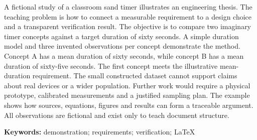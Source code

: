 A fictional study of a classroom sand timer illustrates an engineering thesis.
The teaching problem is how to connect a measurable requirement to a design
choice and a transparent verification result. The objective is to compare two
imaginary timer concepts against a target duration of sixty seconds.
A simple duration model and three invented observations per concept demonstrate
the method. Concept A has a mean duration of sixty seconds, while concept B has
a mean duration of sixty-five seconds. The first concept meets the illustrative
mean-duration requirement. The small constructed dataset cannot support claims
about real devices or a wider population. Further work would require a physical
prototype, calibrated measurements and a justified sampling plan. The example
shows how sources, equations, figures and results can form a traceable argument.
All observations are fictional and exist only to teach document structure.

\textbf{Keywords:} demonstration; requirements; verification; LaTeX
